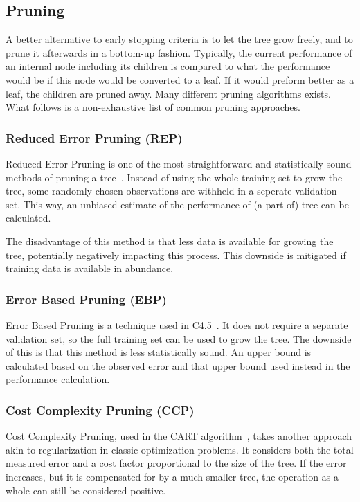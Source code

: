 \subsection{Pruning}
A better alternative to early stopping criteria is to let the tree grow freely, and to prune it afterwards in a bottom-up fashion. Typically, the current performance of an internal node including its children is compared to what the performance would be if this node would be converted to a leaf. If it would preform better as a leaf, the children are pruned away. Many different pruning algorithms exists. What follows is a non-exhaustive list of common pruning approaches.

\subsubsection{Reduced Error Pruning (REP)}
Reduced Error Pruning is one of the most straightforward and statistically sound methods of pruning a tree~\cite{quinlan1987simplifying, repanalysis, elomaa2001analysis}. Instead of using the whole training set to grow the tree, some randomly chosen observations are withheld in a seperate validation set. This way, an unbiased estimate of the performance of (a part of) tree can be calculated.


The disadvantage of this method is that less data is available for growing the tree, potentially negatively impacting this process. This downside is mitigated if training data is available in abundance.

\subsubsection{Error Based Pruning (EBP)}
Error Based Pruning is a technique used in C4.5~\cite{c45}. It does not require a separate validation set, so the full training set can be used to grow the tree. The downside of this is that this method is less statistically sound. An upper bound is calculated based on the observed error and that upper bound used instead in the performance calculation. %

\subsubsection{Cost Complexity Pruning (CCP)}
Cost Complexity Pruning, used in the CART algorithm~\cite{cart}, takes another approach akin to regularization in classic optimization problems. It considers both the total measured error and a cost factor proportional to the size of the tree. If the error increases, but it is compensated for by a much smaller tree, the operation as a whole can still be considered positive.


